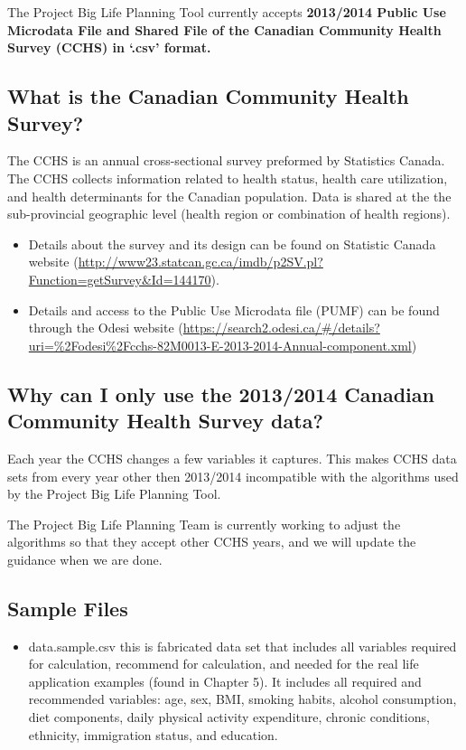 \documentclass[]{book}
\providecommand{\tightlist}{%
  \setlength{\itemsep}{0pt}\setlength{\parskip}{0pt}}
\begin{document}
The Project Big Life Planning Tool currently accepts \textbf{2013/2014
Public Use Microdata File and Shared File of the Canadian Community
Health Survey (CCHS) in `.csv' format.}

\subsection{What is the Canadian Community Health
Survey?}\label{what-is-the-canadian-community-health-survey}

The CCHS is an annual cross-sectional survey preformed by Statistics
Canada. The CCHS collects information related to health status, health
care utilization, and health determinants for the Canadian population.
Data is shared at the the sub-provincial geographic level (health region
or combination of health regions).

\begin{itemize}
\tightlist
\item
  Details about the survey and its design can be found on Statistic
  Canada website
  (\url{http://www23.statcan.gc.ca/imdb/p2SV.pl?Function=getSurvey\&Id=144170}).
\item
  Details and access to the Public Use Microdata file (PUMF) can be
  found through the Odesi website
  (\url{https://search2.odesi.ca/\#/details?uri=\%2Fodesi\%2Fcchs-82M0013-E-2013-2014-Annual-component.xml})
\end{itemize}

\subsection{Why can I only use the 2013/2014 Canadian Community Health
Survey
data?}\label{why-can-i-only-use-the-20132014-canadian-community-health-survey-data}

Each year the CCHS changes a few variables it captures. This makes CCHS
data sets from every year other then 2013/2014 incompatible with the
algorithms used by the Project Big Life Planning Tool.

The Project Big Life Planning Team is currently working to adjust the
algorithms so that they accept other CCHS years, and we will update the
guidance when we are done.

\subsection{Sample Files}\label{sample-files}

\begin{itemize}
\tightlist
\item
  data.sample.csv this is fabricated data set that includes all
  variables required for calculation, recommend for calculation, and
  needed for the real life application examples (found in Chapter 5). It
  includes all required and recommended variables: age, sex, BMI,
  smoking habits, alcohol consumption, diet components, daily physical
  activity expenditure, chronic conditions, ethnicity, immigration
  status, and education.
\end{itemize}
\end{document}

